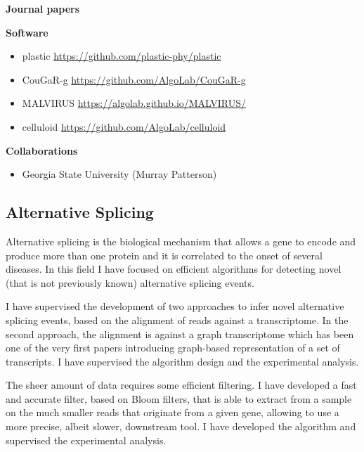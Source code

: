 \documentclass[11pt,a4paper,roman]{moderncv}
\begin{document}
\textbf{Journal papers}

\cite{chourasiaReads2VecEfficientEmbedding2023}
\cite{10.1093/gigascience/giac119}
\cite{DBLP:journals/titb/CiccolellaPBV21}
\cite{DBLP:journals/jco/BonizzoniVDP13}
\cite{DBLP:journals/tcs/BonizzoniVD12}
\cite{DBLP:journals/jco/BonizzoniVD11}
\cite{DBLP:journals/algorithmica/BonizzoniVDM10}
\cite{DBLP:journals/jcss/BonizzoniVDJ08}

\textbf{Software}

\begin{itemize}
	\item
	      plastic \url{https://github.com/plastic-phy/plastic}
	\item
	      CouGaR-g \url{https://github.com/AlgoLab/CouGaR-g}
	\item
	      MALVIRUS \url{https://algolab.github.io/MALVIRUS/}
	\item
	      celluloid \url{https://github.com/AlgoLab/celluloid}
\end{itemize}

\textbf{Collaborations}

\begin{itemize}
	\item
	      Georgia State University (Murray Patterson)
\end{itemize}

\subsection{Alternative Splicing}\label{splicing}

Alternative splicing is the biological mechanism that allows a gene to encode
and produce more than one protein and it is correlated to the onset of several diseases.
In this field I have focused on efficient algorithms for detecting novel (that
is not previously known) alternative splicing events.

I have supervised the development of two approaches to infer novel alternative
splicing events, based on the alignment of reads against a transcriptome.
In the second approach, the alignment is against a graph transcriptome which has
been one of the very first papers introducing graph-based representation of a
set of transcripts.
I have supervised the algorithm design and the experimental analysis.

The sheer amount of data requires some efficient filtering.
I have developed a fast and accurate filter, based on Bloom filters, that is
able to extract from a sample on the much smaller reads that originate from a
given gene, allowing to use a more precise, albeit slower, downstream tool.
I have developed the algorithm and supervised the experimental analysis.
\end{document}
